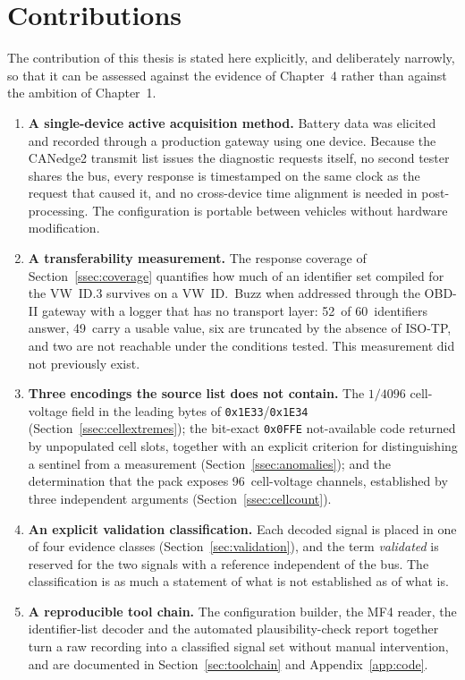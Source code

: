 \documentclass[11pt,a4paper,oneside,parskip=half]{scrreprt}
\providecommand{\hex}{}\renewcommand{\hex}[1]{\texttt{0x#1}}
\begin{document}
\section{Contributions}
The contribution of this thesis is stated here explicitly, and deliberately narrowly, so that it can be assessed against the evidence of Chapter~4 rather than against the ambition of Chapter~1.

\begin{enumerate}
  \item \textbf{A single-device active acquisition method.} Battery data was elicited and recorded through a production gateway using one device. Because the CANedge2 transmit list issues the diagnostic requests itself, no second tester shares the bus, every response is timestamped on the same clock as the request that caused it, and no cross-device time alignment is needed in post-processing. The configuration is portable between vehicles without hardware modification.
  \item \textbf{A transferability measurement.} The response coverage of Section~\ref{ssec:coverage} quantifies how much of an identifier set compiled for the VW~ID.3 survives on a VW~ID.~Buzz when addressed through the OBD-II gateway with a logger that has no transport layer: 52~of 60~identifiers answer, 49~carry a usable value, six are truncated by the absence of ISO-TP, and two are not reachable under the conditions tested. This measurement did not previously exist.
  \item \textbf{Three encodings the source list does not contain.} The $1/4096$ cell-voltage field in the leading bytes of \hex{1E33}/\hex{1E34} (Section~\ref{ssec:cellextremes}); the bit-exact \hex{0FFE} not-available code returned by unpopulated cell slots, together with an explicit criterion for distinguishing a sentinel from a measurement (Section~\ref{ssec:anomalies}); and the determination that the pack exposes 96~cell-voltage channels, established by three independent arguments (Section~\ref{ssec:cellcount}).
  \item \textbf{An explicit validation classification.} Each decoded signal is placed in one of four evidence classes (Section~\ref{sec:validation}), and the term \emph{validated} is reserved for the two signals with a reference independent of the bus. The classification is as much a statement of what is not established as of what is.
  \item \textbf{A reproducible tool chain.} The configuration builder, the MF4 reader, the identifier-list decoder and the automated plausibility-check report together turn a raw recording into a classified signal set without manual intervention, and are documented in Section~\ref{sec:toolchain} and Appendix~\ref{app:code}.
\end{enumerate}
\end{document}
